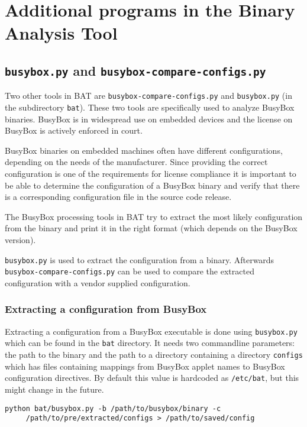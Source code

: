 \documentclass[10pt]{article}
\begin{document}
\section{Additional programs in the Binary Analysis Tool}

\subsection{\texttt{busybox.py} and \texttt{busybox-compare-configs.py}}

Two other tools in BAT are \texttt{busybox-compare-configs.py} and
\texttt{busybox.py} (in the subdirectory \texttt{bat}). These two tools are
specifically used to analyze BusyBox binaries. BusyBox is in widespread use on
embedded devices and the license on BusyBox is actively enforced in court.

BusyBox binaries on embedded machines often have different configurations,
depending on the needs of the manufacturer. Since providing the correct
configuration is one of the requirements for license compliance it is important
to be able to determine the configuration of a BusyBox binary and verify that
there is a corresponding configuration file in the source code release.

The BusyBox processing tools in BAT try to extract the most likely
configuration from the binary and print it in the right format (which
depends on the BusyBox version).

\texttt{busybox.py} is used to extract the configuration from a binary.
Afterwards \texttt{busybox-compare-configs.py} can be used to compare the
extracted configuration with a vendor supplied configuration.

\subsubsection{Extracting a configuration from BusyBox}

Extracting a configuration from a BusyBox executable is done using
\texttt{busybox.py} which can be found in the \texttt{bat} directory. It needs
two commandline parameters: the path to the binary and the path to a directory
containing a directory \texttt{configs} which has files containing mappings
from BusyBox applet names to BusyBox configuration directives. By default this
value is hardcoded as \texttt{/etc/bat}, but this might change in the future.

\begin{verbatim}
python bat/busybox.py -b /path/to/busybox/binary -c
     /path/to/pre/extracted/configs > /path/to/saved/config
\end{verbatim}
\end{document}

